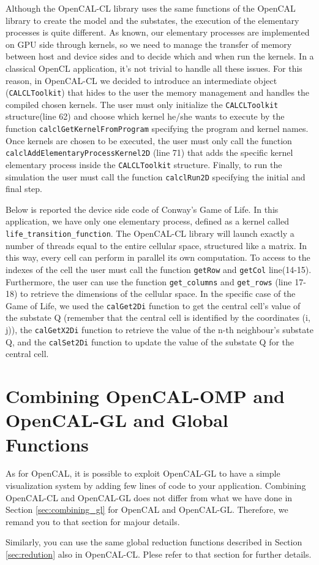 Although the OpenCAL-CL library uses the same functions of the OpenCAL
library to create the model and the substates, the execution of the
elementary processes is quite different. As known, our elementary
processes are implemented on GPU side through kernels, so we need to
manage the transfer of memory between host and device sides and to
decide which and when run the kernels. In a classical OpenCL
application, it's not trivial to handle all these issues. For this
reason, in OpenCAL-CL we decided to introduce an intermediate object
(\verb'CALCLToolkit') that hides to the user the memory management and
handles the compiled chosen kernels. The user must only initialize the
\verb'CALCLToolkit' structure(line 62) and choose which kernel he/she
wants to execute by the function \verb'calclGetKernelFromProgram'
specifying the program and kernel names. Once kernels are chosen to be
executed, the user must only call the function
\verb'calclAddElementaryProcessKernel2D' (line 71) that adds the
specific kernel elementary process inside the \verb'CALCLToolkit'
structure. Finally, to run the simulation the user must call the
function \verb'calclRun2D' specifying the initial and final step.

Below is reported the device side code of Conway's Game of Life.  In
this application, we have only one elementary process, defined as a
kernel called \verb'life_transition_function'. The OpenCAL-CL library
will launch exactly a number of threads equal to the entire cellular
space, structured like a matrix. In this way, every cell can perform
in parallel its own computation. To access to the indexes of the cell
the user must call the function \verb'getRow' and \verb'getCol'
line(14-15). Furthermore, the user can use the function
\verb'get_columns' and \verb'get_rows' (line 17-18) to retrieve the
dimensions of the cellular space.  In the specific case of the Game of
Life, we used the \verb'calGet2Di' function to get the central cell’s
value of the substate Q (remember that the central cell is identified
by the coordinates (i, j)), the \verb'calGetX2Di' function to retrieve
the value of the n-th neighbour’s substate Q, and the \verb'calSet2Di'
function to update the value of the substate Q for the central cell.




\section{Combining OpenCAL-OMP and OpenCAL-GL and  Global Functions}

As for OpenCAL, it is possible to exploit OpenCAL-GL to have a simple
visualization system by adding few lines of code to your
application. Combining OpenCAL-CL and OpenCAL-GL does not differ from
what we have done in Section \ref{sec:combining_gl} for OpenCAL and
OpenCAL-GL. Therefore, we remand you to that section for majour
details.

Similarly, you can use the same global reduction functions
described in Section \ref{sec:redution} also in OpenCAL-CL.  Plese
refer to that section for further details.
